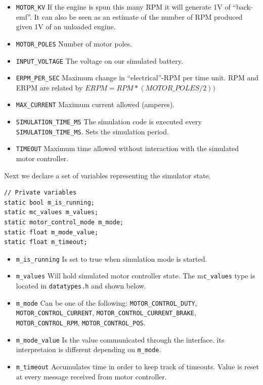 \documentclass[12pt]{article} %
\begin{document}
{\begin{itemize}
\item \verb!MOTOR_KV! If the engine is spun this many RPM it will generate 1V of ``back-emf''. It can also be seen as an estimate of the number of RPM produced given 1V of an unloaded engine.
\item \verb!MOTOR_POLES! Number of motor poles. 
\item \verb!INPUT_VOLTAGE! The voltage on our simulated battery. 
\item \verb!ERPM_PER_SEC! Maximum change in ``electrical''-RPM per time unit.
  RPM and ERPM are related by $ERPM = RPM*(MOTOR\_POLES/2))$
\item \verb!MAX_CURRENT! Maximum current allowed (amperes).
\item \verb!SIMULATION_TIME_MS! The simulation code is executed every \verb!SIMULATION_TIME_MS!. Sets the simulation period. 
\item \verb!TIMEOUT! Maximum time allowed without interaction with the simulated motor controller.
\end{itemize}

Next we declare a set of variables representing the simulator state.

\begin{Verbatim}[samepage=true,frame=single,label=Embedded/RC\_Controller/motor\_sim.c]
// Private variables
static bool m_is_running;
static mc_values m_values;
static motor_control_mode m_mode;
static float m_mode_value;
static float m_timeout;
\end{Verbatim}

\begin{itemize}
\item \verb!m_is_running! Is set to true when simulation mode is started.
\item \verb!m_values! Will hold simulated motor controller state. The m\verb!c_values! type is located in \verb!datatypes.h! and shown below.
\item \verb!m_mode! Can be one of the following:
  \verb!MOTOR_CONTROL_DUTY!, \verb!MOTOR_CONTROL_CURRENT!,
  \verb!MOTOR_CONTROL_CURRENT_BRAKE!, \verb!MOTOR_CONTROL_RPM!,
  \verb!MOTOR_CONTROL_POS!.
\item \verb!m_mode_value! Is the value communicated through the
  interface. its interpretaion is different depending on
  \verb!m_mode!.
\item \verb!m_timeout! Accumulates time in order to keep track of
    timeouts. Value is reset at every message received from motor
    controller.
\end{itemize}


}
\end{document}
